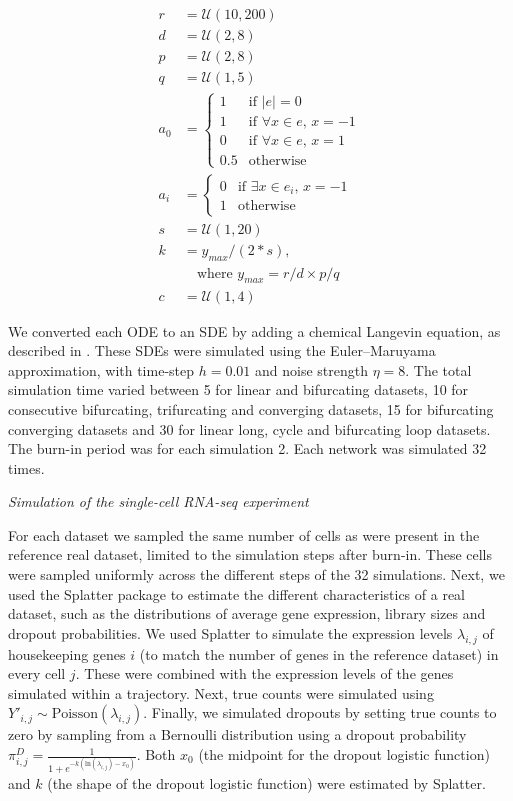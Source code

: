 $$
\begin{aligned}
r & = \mathcal{U}(10, 200) \\
d & = \mathcal{U}(2, 8) \\
p & = \mathcal{U}(2, 8) \\
q & = \mathcal{U}(1, 5) \\
a_0 & = \begin{cases}1 & \text{if } |e| = 0 \\ 1 & \text{if } \forall x \in e \text{, } x = -1 \\ 0 & \text{if } \forall x \in e \text{, } x = 1 \\ 0.5 & \text{otherwise}\end{cases} \\
a_i & = \begin{cases}0 & \text{if } \exists x \in e_i \text{, } x = -1 \\ 1 & \text{otherwise}\end{cases} \\
s & = \mathcal{U}(1, 20) \\
k & = y_{max} / (2 * s) \text{,} \\
\ & \quad \text{where } y_{max} = r / d \times p / q \\
c & = \mathcal{U}(1, 4)
\end{aligned}
$$

We converted each ODE to an SDE by adding a chemical Langevin equation, as described in \cite{schaffter_genenetweaversilicobenchmark_2011}. These SDEs were simulated using the Euler–Maruyama approximation, with time-step $h = 0.01$ and noise strength $\eta = 8$. The total simulation time varied between 5 for linear and bifurcating datasets, 10 for consecutive bifurcating, trifurcating and converging datasets, 15 for bifurcating converging datasets and 30 for linear long, cycle and bifurcating loop datasets. The burn-in period was for each simulation 2. Each network was simulated 32 times.

\hfill\break
\textit{Simulation of the single-cell RNA-seq experiment}
\hfill\break

For each dataset we sampled the same number of cells as were present in the reference real dataset, limited to the simulation steps after burn-in. These cells were sampled uniformly across the different steps of the 32 simulations.  Next, we used the Splatter package \cite{zappia_splattersimulationsinglecell_2017} to estimate the different characteristics of a real dataset, such as the distributions of average gene expression, library sizes and dropout probabilities. We used Splatter to simulate the expression levels $\lambda_{i,j}$ of housekeeping genes $i$ (to match the number of genes in the reference dataset) in every cell $j$. These were combined with the expression levels of the genes simulated within a trajectory. Next, true counts were simulated using $Y'_{i,j} \sim \text{Poisson}(\lambda_{i,j})$. Finally, we simulated dropouts by setting true counts to zero by sampling from a Bernoulli distribution using a dropout probability $\pi^D_{i,j} =\frac{1}{1+e^{-k(\text{ln}(\lambda_{i,j})-x_0)}}$. Both $x_0$ (the midpoint for the dropout logistic function) and $k$ (the shape of the dropout logistic function) were estimated by Splatter.

